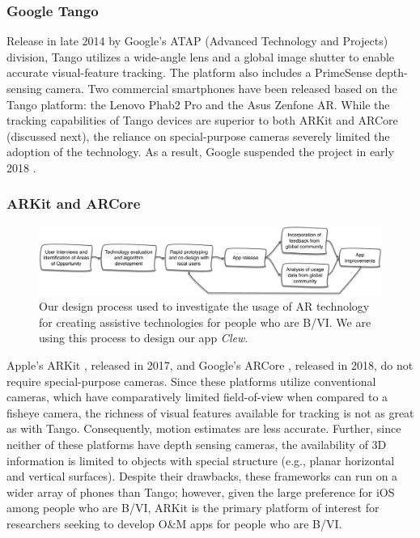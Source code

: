 \documentclass[chi_draft]{sigchi}
\newcommand{\BVI}{B/VI\xspace}
\newcommand{\OM}{O\&M\xspace}
\begin{document}
\subsubsection{Google Tango}
Release in late 2014 by Google's ATAP (Advanced Technology and Projects) division, Tango utilizes a wide-angle lens and a global image shutter to enable accurate visual-feature tracking.  The platform also includes a PrimeSense depth-sensing camera.  Two commercial smartphones have been released based on the Tango platform: the Lenovo Phab2 Pro and the Asus Zenfone AR.  While the tracking capabilities of Tango devices are superior to both ARKit and ARCore (discussed next), the reliance on special-purpose cameras severely limited the adoption of the technology.  As a result, Google suspended the project in early 2018 \cite{tangoretired}.


\subsubsection{ARKit and ARCore}
\begin{figure}
\includegraphics[width=\linewidth]{Figures/designprocess}
\caption{Our design process used to investigate the usage of AR technology for creating assistive technologies for people who are \BVI.  We are using this process to design our app \emph{Clew}.\label{fig:designprocess}}
\end{figure}
Apple's ARKit \cite{arkit}, released in 2017, and Google's ARCore \cite{arcore}, released in 2018, do not require special-purpose cameras.  Since these platforms utilize conventional cameras, which have comparatively limited field-of-view when compared to a fisheye camera, the richness of visual features available for tracking is not as great as with Tango.  Consequently, motion estimates are less accurate.  Further, since neither of these platforms have depth sensing cameras, the availability of 3D information is limited to objects with special structure (e.g., planar horizontal and vertical surfaces).  Despite their drawbacks, these frameworks can run on a wider array of phones than Tango; however, given the large preference for iOS among people who are \BVI \cite{morris2014blind}, ARKit is the primary platform of interest for researchers seeking to develop \OM apps for people who are \BVI.
\end{document}
